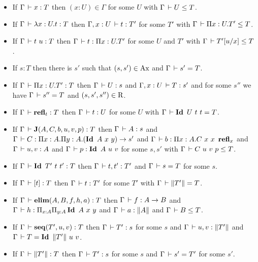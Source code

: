 \documentclass[a4paper,english]{lipics-utf8x}
\begin{document}

  \begin{lemma}[Inversion]
    \label{lem:inversion}
    \leavevmode
    \begin{itemize}
      \item If $\Gamma \,\vdash x : T$ then $(x:U) \in \Gamma$ for some
      $U$ with $\Gamma \,\vdash U \le T$.
      \item If $\Gamma \,\vdash \lambda x:U.t : T$ then $\Gamma, x:U \,\vdash t : T'$
      for some $T'$ with $\Gamma \,\vdash \Pi x:U.T' \le T$.
      \item If $\Gamma \,\vdash t\ u : T$ then $\Gamma \,\vdash t : \Pi x:U.T'$
      for some $U$ and $T'$ with $\Gamma \,\vdash T'[u/x] \le T$.
      \item If $s : T$ then there is $s'$ such that $(s,s') \in \operatorname{Ax}$
      and $\Gamma \,\vdash s' = T$.
      \item If $\Gamma \,\vdash \Pi x:U.T' : T$ then $\Gamma \,\vdash U : s$
      and $\Gamma, x:U \,\vdash T : s'$ and for some $s''$ we have
      $\Gamma \,\vdash s'' = T$ and $(s,s',s'') \in \operatorname{R}$.
      \item If $\Gamma \,\vdash \operatorname{\mathbf{refl}}_t : T$ then $\Gamma \,\vdash t : U$
      for some $U$ with $\Gamma \,\vdash \operatorname{\mathbf{Id}~} U\ t\ t = T$.
      \item If $\Gamma \,\vdash \operatorname{\mathbf{J}}(A,C,b,u,v,p) : T$ then $\Gamma \,\vdash A : s$
      and $\Gamma \der C : \Pi x:A. \Pi y:A. (\Id A\ x\ y) \to s'$ and
      $\Gamma \,\vdash b : \Pi x:A. C\ x\ x\ \operatorname{\mathbf{refl}}_x$ and $\Gamma \,\vdash u, v : A$
      and $\Gamma \der p : \Id A\ u\ v$ for some $s,s'$ with
      $\Gamma \,\vdash C\ u\ v\ p \le T$.
      \item If $\Gamma \,\vdash \operatorname{\mathbf{Id}~} T'\ t\ t' : T$ then $\Gamma \,\vdash t,t' : T'$
      and $\Gamma \,\vdash s = T$ for some $s$.
      \item If $\Gamma \,\vdash [t] : T$ then $\Gamma \,\vdash t : T'$ for some
      $T'$ with $\Gamma \,\vdash \|T'\| = T$.
      \item If $\Gamma \,\vdash \operatorname{\mathbf{elim}}(A,B,f,h,a) : T$ then
      $\Gamma \,\vdash f : A \to B$ and
      $\Gamma \,\vdash h : \Pi_{x:A} \Pi_{y:A} \operatorname{\mathbf{Id}~} A\ x\ y$
      and $\Gamma \,\vdash a : \|A\|$ and $\Gamma \,\vdash B \le T$.
      \item If $\Gamma \,\vdash \operatorname{\mathbf{seq}}(T',u,v) : T$ then $\Gamma \,\vdash T' : s$ for
      some $s$ and $\Gamma \,\vdash u, v : \|T'\|$ and
      $\Gamma \der T = \Id \squash{T'}\ u\ v$.
      \item If $\Gamma \,\vdash \|T'\| : T$ then $\Gamma \,\vdash T' : s$ for
      some $s$ and $\Gamma \,\vdash s' = T'$ for some $s'$.
    \end{itemize}
  \end{lemma}
\end{document}
